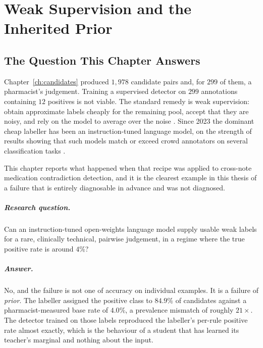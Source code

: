 %
%

\chapter{Weak Supervision and the Inherited Prior}
\label{ch:weak}

\section{The Question This Chapter Answers}
\label{sec:weak-overview}

Chapter~\ref{ch:candidates} produced $1{,}978$ candidate pairs and, for $299$ of
them, a pharmacist's judgement. Training a supervised detector on $299$
annotations containing $12$ positives is not viable. The standard remedy is weak
supervision: obtain approximate labels cheaply for the remaining pool, accept
that they are noisy, and rely on the model to average over the noise
\citep{ratner2017snorkel}. Since 2023 the dominant cheap labeller has been an
instruction-tuned language model, on the strength of results showing that such
models match or exceed crowd annotators on several classification tasks
\citep{gilardi2023chatgpt}.

This chapter reports what happened when that recipe was applied to
cross-note medication contradiction detection, and it is the clearest example in
this thesis of a failure that is entirely diagnosable in advance and was not
diagnosed.

\paragraph{Research question.} Can an instruction-tuned open-weights language
model supply usable weak labels for a rare, clinically technical, pairwise
judgement, in a regime where the true positive rate is around $4\%$?

\paragraph{Answer.} No, and the failure is not one of accuracy on individual
examples. It is a failure of \emph{prior}. The labeller assigned the positive
class to $84.9\%$ of candidates against a pharmacist-measured base rate of
$4.0\%$, a prevalence mismatch of roughly $21\times$. The detector trained on
those labels reproduced the labeller's per-rule positive rate almost exactly,
which is the behaviour of a student that has learned its teacher's marginal and
nothing about the input.

